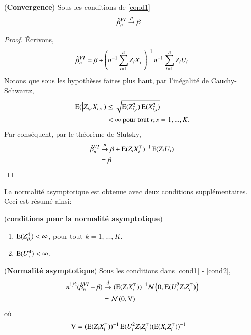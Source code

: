\begin{propriete}(\textbf{Convergence})
Sous les conditions de \eqref{cond1}
\begin{align*}
	\hat{\beta}^{VI}_n  &\overset{p}{\rightarrow} \beta
\end{align*}
	\label{pr1}
\end{propriete}
\begin{proof}
\'Ecrivons,
\begin{align}
\hat{\beta}^{VI}_n = \beta + \left(n^{-1}\sum_{i=1}^n Z_iX_i^\top\right)^{-1}n^{-1}\sum_{i=1}^n Z_iU_i
\label{eq3}
\end{align}
Notons que sous les hypothèses faites plus haut, par l'inégalité de Cauchy-Schwartz,
\begin{align*}
\operatorname{E}(\left\vert {Z_{i,r}X_{i,s}} \right\vert) &\leq \sqrt{\operatorname{E}(Z_{i,r}^2)\operatorname{E}(X_{i,s}^2)}\\
&< \infty \ \textrm{pour tout} \ r, s = 1,...,K.
\end{align*}
Par conséquent, par le théorème de Slutsky,
\begin{align*}
\hat{\beta}^{VI}_n  &\overset{p}{\rightarrow} \beta + \operatorname{E}(Z_iX_i^\top)^{-1}\operatorname{E}(Z_iU_i)\\
&= \beta
\end{align*}
\end{proof}

La normalité asymptotique est obtenue avec deux conditions supplémentaires. Ceci est résumé ainsi:
\begin{condition}(\textbf{conditions pour la normalité asymptotique})
\begin{enumerate}[label = (C2.\arabic*)]
\item $\operatorname{E}(Z_{ik}^4) < \infty$, pour tout $k=1,...,K$. 
\item $\operatorname{E}(U_i^4)<\infty$.
\end{enumerate}
\label{cond2}
\end{condition}

\begin{propriete}(\textbf{Normalité asymptotique})
Sous les conditions dans \eqref{cond1} - \eqref{cond2},
\begin{align*}
	n^{1/2}(\hat{\beta}^{VI}_n - \beta ) &\overset{d}{\rightarrow} (\operatorname{E}(Z_iX_i^\top))^{-1}\mathcal{N}\left(0,\operatorname{E}(U_i^2Z_iZ_i^\top)\right)\\
&=\mathcal{N}\left(0,  \operatorname{V}\right)
\end{align*}
où 
\begin{align*}
\operatorname{V} &= (\operatorname{E}(Z_iX_i^\top))^{-1}\operatorname{E}(U_i^2Z_iZ_i^\top) (\operatorname{E}(X_iZ_i^\top))^{-1}
\end{align*}
	\label{pr2}
\end{propriete}

